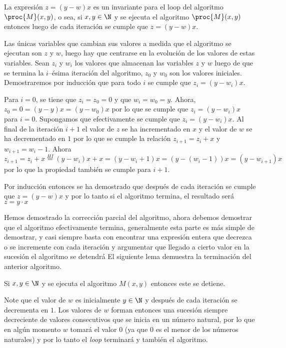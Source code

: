 \begin{lema}
La expresión $z=(y-w)x$ es un invariante para el loop del algoritmo $\proc{M}(x,y)$, o sea,
si $x,y\in\N$ y se ejecuta el algoritmo $\proc{M}(x,y)$ entonces luego de cada iteración se cumple que $z=(y-w)x$.

\begin{demostracion}
Las únicas variables que cambian sus valores a medida que el algoritmo se ejecutan son $z$ y $w$, luego hay que centrarse en la evolución de los valores de estas variables.
Sean $z_i$ y $w_i$ los valores que almacenan las variables $z$ y $w$ luego de que se termina la $i$--ésima iteración del algoritmo, $z_0$ y $w_0$ son los valores iniciales.
Demostraremos por inducción que para todo $i$ se cumple que $z_i=(y-w_i)x$.
\begin{inducciondemo}
  \BI Para $i=0$, se tiene que $z_i=z_0=0$ y que $w_i=w_0=y$.
  Ahora, $z_0=0=(y-y)x=(y-w_0)x$ por lo que se cumple que $z_i=(y-w_i)x$ para $i=0$.
  \HI Supongamos que efectivamente se cumple que $z_i=(y-w_i)x$.
  \TI Al final de la iteración $i+1$ el valor de $z$ se ha incrementado en $x$ y el valor de $w$ se ha decrementado en $1$ por lo que se cumple la relación $z_{i+1}=z_i+x$ y $w_{i+1}=w_i-1$.
  Ahora
  \[
  z_{i+1}=z_i+x\stackrel{HI}{=}(y-w_i)x+x=(y-w_i+1)x=(y-(w_i-1))x=(y-w_{i+1})x
  \]
  por lo que la propiedad también se cumple para $i+1$.
\end{inducciondemo}
Por inducción entonces se ha demostrado que después de cada iteración se cumple que $z=(y-w)x$ y por lo tanto si el algoritmo termina, el resultado será $z=y\cdot x$
\end{demostracion}
\end{lema}

Hemos demostrado la corrección parcial del algoritmo, ahora debemos demostrar que el algoritmo efectivamente termina, generalmente esta parte es más simple de demostrar, y casi siempre basta con encontrar una expresión entera que decrezca o se incremente con cada iteración y argumentar que llegado a cierto valor en la sucesión el algoritmo se detendrá
El siguiente lema demuestra la terminación del anterior algoritmo.

\begin{lema}
Si $x,y\in\N$ y se ejecuta el algoritmo $M(x,y)$ entonces este se detiene.

\begin{demostracion}
Note que el valor de $w$ es inicialmente $y\in\N$ y después de cada iteración se decrementa en $1$.
Los valores de $w$ forman entonces una sucesión siempre decreciente de valores consecutivos que se inicia en un número natural, por lo que en algún momento $w$ tomará el valor $0$ (ya que $0$ es el menor de los números naturales) y por lo tanto el \emph{loop} terminará y también el algoritmo.
\end{demostracion}
\end{lema}

